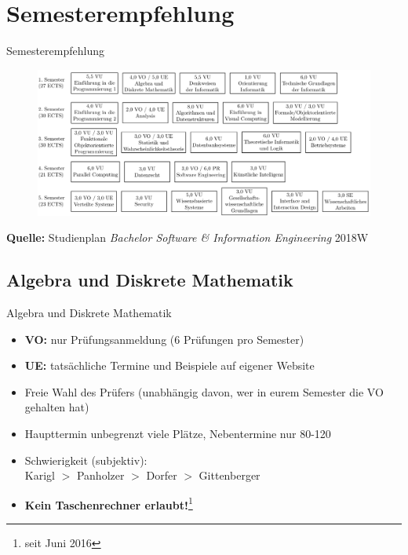\documentclass{beamer}
\begin{document}
\section{Semesterempfehlung}
\begin{frame}{Semesterempfehlung}
    \begin{figure}[htp]
        \centering
        \includegraphics[width=1\textwidth]{semesterempfehlung.png}
    \end{figure}
    \tiny \textbf{Quelle:} Studienplan \textit{Bachelor Software \&
        Information Engineering} 2018W
\end{frame}

\subsection{Algebra und Diskrete Mathematik}
\begin{frame}{Algebra und Diskrete Mathematik}
    \begin{itemize}
        \item \textbf{VO:} nur Prüfungsanmeldung (6 Prüfungen pro Semester)
        \item \textbf{UE:} tatsächliche Termine und Beispiele auf eigener Website
        \item Freie Wahl des Prüfers (unabhängig davon, wer in eurem Semester die VO gehalten hat)
        \item Haupttermin unbegrenzt viele Plätze, Nebentermine nur 80-120
        \item Schwierigkeit (subjektiv): \\
            Karigl $>$ Panholzer $>$ Dorfer $>$ Gittenberger
        \item \textbf{Kein Taschenrechner erlaubt!}\footnote{seit Juni 2016}
    \end{itemize}
\end{frame}
\end{document}
